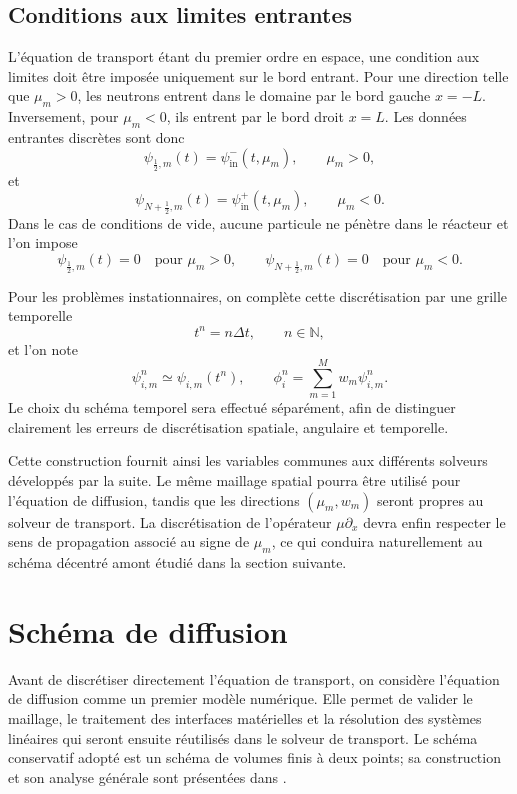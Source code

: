 \documentclass{article}
\begin{document}
\subsection {Conditions aux limites entrantes}

L'équation de transport étant du premier ordre en espace, une condition aux limites doit être imposée uniquement sur le bord entrant. Pour une direction telle que $\mu_m>0$, les neutrons entrent dans le domaine par le bord gauche $x=-L$. Inversement, pour $\mu_m<0$, ils entrent par le bord droit $x=L$. Les données entrantes discrètes sont donc
\[
    \psi_{\frac12,m}(t) = \psi_{\mathrm{in}}^{-}(t,\mu_m),  \qquad \mu_m>0,
\]
et
\[
    \psi_{N+\frac12,m}(t) = \psi_{\mathrm{in}}^{+}(t,\mu_m), \qquad \mu_m<0.
\]
Dans le cas de conditions de vide, aucune particule ne pénètre dans le réacteur et l'on impose
\[
    \psi_{\frac12,m}(t)=0 \quad  \text{pour }\mu_m>0,
    \qquad
    \psi_{N+\frac12,m}(t)=0 \quad\text{pour }\mu_m<0.
\]

Pour les problèmes instationnaires, on complète cette discrétisation par une grille temporelle
\[
    t^n=n\Delta t, \qquad  n\in\mathbb{N},
\]
et l'on note
\[
    \psi_{i,m}^n\simeq\psi_{i,m}(t^n), \qquad  \phi_i^n=\sum_{m=1}^{M}w_m\psi_{i,m}^n.
\]
Le choix du schéma temporel sera effectué séparément, afin de distinguer clairement les erreurs de discrétisation spatiale, angulaire et temporelle.

Cette construction fournit ainsi les variables communes aux différents solveurs développés par la suite. Le même maillage spatial pourra être utilisé pour l'équation de diffusion, tandis que les directions
$(\mu_m,w_m)$ seront propres au solveur de transport. La discrétisation de l'opérateur $\mu\partial_x$ devra enfin respecter le sens de propagation associé au signe de $\mu_m$, ce qui conduira naturellement au schéma décentré amont étudié dans la section suivante.


\section {Schéma de diffusion}
\label{subsec:schema-diffusion}

Avant de discrétiser directement l'équation de transport, on considère l'équation de diffusion comme un premier modèle numérique. Elle permet de valider le maillage, le traitement des interfaces matérielles et la résolution des systèmes linéaires qui seront ensuite réutilisés dans le solveur de transport. Le schéma conservatif adopté est un schéma de volumes finis à deux points; sa construction et son analyse générale sont présentées dans \textcite{Eymard2000}.
\end{document}

